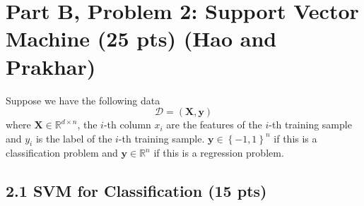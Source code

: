 \documentclass{article}
\begin{document}
\newpage


\section*{Part B, Problem 2: Support Vector Machine (25 pts) (Hao and Prakhar)}
Suppose we have the following data $$\mathcal{D} = (\mathbf{X},\mathbf{y})$$ where $\mathbf{X} \in \mathbb{R}^{d \times n}$, the $i$-th column $x_i$ are the features of the $i$-th training sample and $y_i$ is the label of the $i$-th training sample.
$\mathbf{y} \in \left\{-1,1\right\}^n$ if this is a classification problem and $\mathbf{y} \in \mathbb{R}^n$ if this is a regression problem.


\subsection*{2.1 SVM for Classification (15 pts)}
\end{document}
